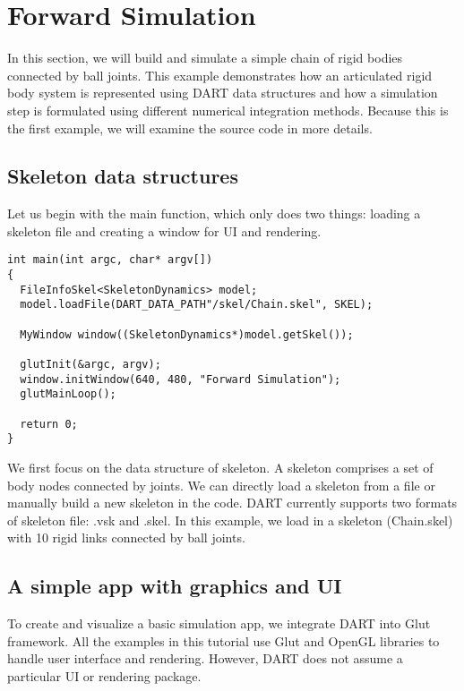 \section{Forward Simulation}
In this section, we will build and simulate a simple chain of rigid
bodies connected by ball joints. This example demonstrates how an
articulated rigid body system is represented using DART data
structures and how a simulation step is formulated using different
numerical integration methods. Because this is the first example, we
will examine the source code in more details.

\subsection{Skeleton data structures}
Let us begin with the main function, which only does two things:
loading a skeleton file and creating a window for UI and rendering. 

\ttfamily
\begin{lstlisting}[caption=Main.cpp]
int main(int argc, char* argv[])
{
  FileInfoSkel<SkeletonDynamics> model;
  model.loadFile(DART_DATA_PATH"/skel/Chain.skel", SKEL);

  MyWindow window((SkeletonDynamics*)model.getSkel());
  
  glutInit(&argc, argv);
  window.initWindow(640, 480, "Forward Simulation");
  glutMainLoop();

  return 0;
}
\end{lstlisting}
\rmfamily 

We first focus on the data structure of skeleton. A skeleton comprises
a set of body nodes connected by joints. We can directly load a
skeleton from a file or manually build a new skeleton in the
code. DART currently supports two formats of skeleton file: .vsk and
.skel. In this example, we load in a skeleton (Chain.skel) with 10
rigid links connected by ball joints.


\subsection{A simple app with graphics and UI}
To create and visualize a basic simulation app, we integrate DART into
Glut framework. All the examples in this tutorial use Glut and OpenGL
libraries to handle user interface and rendering. However, DART does
not assume a particular UI or rendering package.


